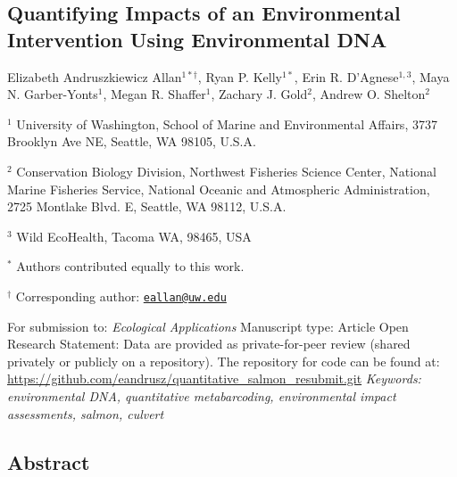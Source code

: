 \documentclass[
]{article}
\author{}
\date{\vspace{-2.5em}}
\begin{document}
\hypertarget{quantifying-impacts-of-an-environmental-intervention-using-environmental-dna}{%
\subsection{Quantifying Impacts of an Environmental Intervention Using
Environmental
DNA}\label{quantifying-impacts-of-an-environmental-intervention-using-environmental-dna}}

Elizabeth Andruszkiewicz Allan\(^{1*\dagger}\), Ryan P. Kelly\(^{1*}\),
Erin R. D'Agnese\(^{1,3}\), Maya N. Garber-Yonts\(^{1}\), Megan R.
Shaffer\(^{1}\), Zachary J. Gold\(^{2}\), Andrew O. Shelton\(^{2}\)

\(^{1}\) University of Washington, School of Marine and Environmental
Affairs, 3737 Brooklyn Ave NE, Seattle, WA 98105, U.S.A.

\(^2\) Conservation Biology Division, Northwest Fisheries Science
Center, National Marine Fisheries Service, National Oceanic and
Atmospheric Administration, 2725 Montlake Blvd. E, Seattle, WA 98112,
U.S.A.

\(^3\) Wild EcoHealth, Tacoma WA, 98465, USA

\vspace{1em}

\(^{*}\) Authors contributed equally to this work.

\(^{\dagger}\) Corresponding author:
\href{mailto:eallan@uw.edu}{\nolinkurl{eallan@uw.edu}} \vspace{1em}

For submission to: \textit{Ecological Applications} \newline Manuscript
type: Article \newline Open Research Statement: Data are provided as
private-for-peer review (shared privately or publicly on a repository).
The repository for code can be found at:
\url{https://github.com/eandrusz/quantitative_salmon_resubmit.git}
\newline \textit{Keywords: environmental DNA, quantitative metabarcoding, environmental impact assessments, salmon, culvert}

\newpage

\hypertarget{abstract}{%
\subsection{Abstract}\label{abstract}}
\end{document}
